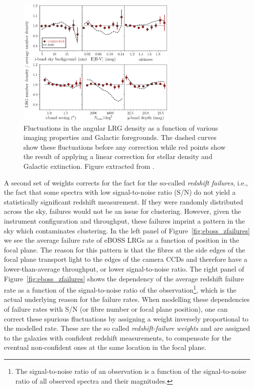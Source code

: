 \begin{figure}
    \centering 
    \includegraphics[width=0.7\textwidth]{fig/galaxies/photometric_weights_lrg.png}
    \caption{ Fluctuations in the angular LRG density as a function of 
    various imaging properties and Galactic foregrounds. 
    The dashed curves show these fluctuations before any correction 
    while red points show the result of applying a linear correction for 
    stellar density and Galactic extinction. 
    Figure extracted from \cite{rossCompletedSDSSIVExtended2020}.} 
    \label{fig:photo_systematics_lrg}
\end{figure}

A second set of weights corrects for the fact for the so-called \emph{redshift failures}, 
i.e., the fact that some spectra with low signal-to-noise ratio (S/N)
do not yield a statistically significant redshift measurement. 
If they were randomly distributed across the sky, failures would not be an issue for 
clustering. However, given the instrument configuration and throughput, these failures 
imprint a pattern in the sky which contaminates clustering. 
In the left panel of Figure~\ref{fig:eboss_zfailures} we see the average failure rate 
of eBOSS LRGs as a function of position in the focal plane. The reason for this pattern
is that the fibres at the side edges of the focal plane transport light to the edges 
of the camera CCDs and therefore have a lower-than-average throughput, or lower signal-to-noise
ratio. 
The right panel of Figure~\ref{fig:eboss_zfailures} shows the 
dependency of the average redshift failure rate as a function of the signal-to-noise
ratio of the observation\footnote{The signal-to-noise ratio of an observation is 
a function of the signal-to-noise ratio of all observed spectra and their magnitudes.}, 
which is the actual underlying reason for the failure rates. 
When modelling these dependencies of failure rates with S/N (or fibre number or focal plane
position), one can correct these spurious fluctuations by assigning a weight 
inversely proportional to the modelled rate. 
These are the so called \emph{redshift-failure weights} and are assigned to the 
galaxies with confident redshift measurements, to compensate for the eventual 
non-confident ones at the same location in the focal plane. 

